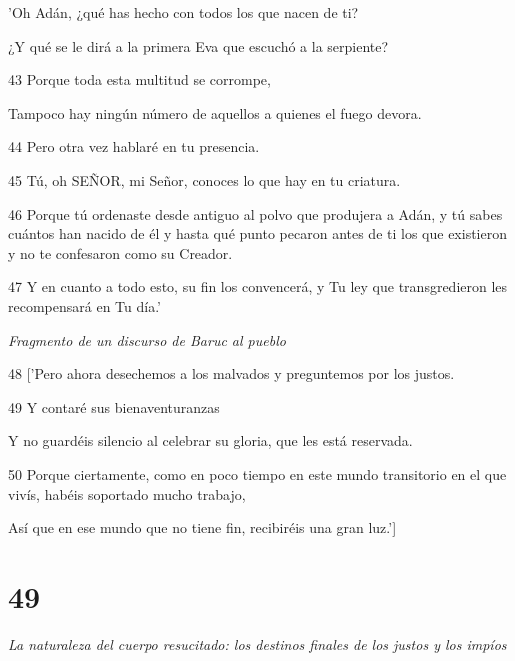 \par 'Oh Adán, ¿qué has hecho con todos los que nacen de ti?

\par ¿Y qué se le dirá a la primera Eva que escuchó a la serpiente?

\par 43 Porque toda esta multitud se corrompe,

\par Tampoco hay ningún número de aquellos a quienes el fuego devora.

\par 44 Pero otra vez hablaré en tu presencia.

\par 45 Tú, oh SEÑOR, mi Señor, conoces lo que hay en tu criatura.

\par 46 Porque tú ordenaste desde antiguo al polvo que produjera a Adán, y tú sabes cuántos han nacido de él y hasta qué punto pecaron antes de ti los que existieron y no te confesaron como su Creador.

\par 47 Y en cuanto a todo esto, su fin los convencerá, y Tu ley que transgredieron les recompensará en Tu día.'

\par \textit{Fragmento de un discurso de Baruc al pueblo}

\par 48 ['Pero ahora desechemos a los malvados y preguntemos por los justos.

\par 49 Y contaré sus bienaventuranzas

\par Y no guardéis silencio al celebrar su gloria, que les está reservada.

\par 50 Porque ciertamente, como en poco tiempo en este mundo transitorio en el que vivís, habéis soportado mucho trabajo,

\par Así que en ese mundo que no tiene fin, recibiréis una gran luz.']

\chapter{49}

\par \textit{La naturaleza del cuerpo resucitado: los destinos finales de los justos y los impíos}

